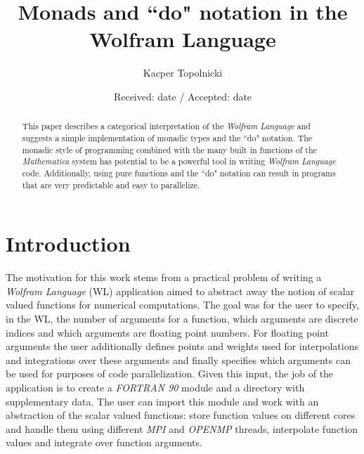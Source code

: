 \documentclass[smallextended]{svjour3}
\begin{document}
\title{Monads and ``do" notation in the Wolfram Language}
\author{Kacper Topolnicki}

\date{Received: date / Accepted: date}

\maketitle

\begin{abstract}
This paper describes a categorical interpretation of the
\emph{Wolfram Language}
and suggests a simple implementation of monadic types and the ``do" notation. 
The monadic style of programming combined with the many built 
	in functions of the \emph{Mathematica} \cite{mathematica} system has potential to be a 
powerful tool in writing \emph{Wolfram Language} code. Additionally,
using pure functions and the ``do" notation can result in programs that
are very predictable and easy to parallelize.
\end{abstract}

\section{Introduction}

The motivation for this work stems from a
practical problem of 
writing a \emph{Wolfram Language} (WL) application aimed to abstract away
the notion of scalar valued functions for numerical computations.
The goal was for the user to specify, in the WL, the number of arguments for 
a function, which arguments are discrete indices and which arguments
are floating point numbers. For floating point arguments the user additionally
defines points
and weights used for interpolations and integrations over these arguments and
finally specifies which arguments can be used for purposes of code parallelization.
Given this input, the job of the application is to create a \emph{FORTRAN 90}
module and a directory with supplementary data. 
The user can import this module and work with
an abstraction of the scalar valued functions: store function values on 
different cores and handle them using different \emph{MPI} and \emph{OPENMP}
threads, interpolate function values and integrate over function arguments.
\end{document}
